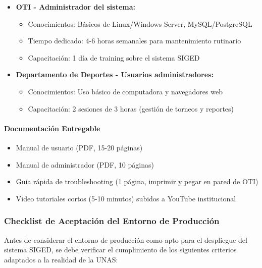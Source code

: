 \documentclass[12pt,a4paper]{article}
\begin{document}
\begin{itemize}[noitemsep]
    \item \textbf{OTI - Administrador del sistema:} 
    \begin{itemize}
        \item Conocimientos: Básicos de Linux/Windows Server, MySQL/PostgreSQL
        \item Tiempo dedicado: 4-6 horas semanales para mantenimiento rutinario
        \item Capacitación: 1 día de training sobre el sistema SIGED
    \end{itemize}
    \item \textbf{Departamento de Deportes - Usuarios administradores:}
    \begin{itemize}
        \item Conocimientos: Uso básico de computadora y navegadores web
        \item Capacitación: 2 sesiones de 3 horas (gestión de torneos y reportes)
    \end{itemize}
\end{itemize}

\paragraph{Documentación Entregable}

\begin{itemize}[noitemsep]
    \item Manual de usuario (PDF, 15-20 páginas)
    \item Manual de administrador (PDF, 10 páginas)
    \item Guía rápida de troubleshooting (1 página, imprimir y pegar en pared de OTI)
    \item Video tutoriales cortos (5-10 minutos) subidos a YouTube institucional
\end{itemize}

\subsubsection{Checklist de Aceptación del Entorno de Producción}

Antes de considerar el entorno de producción como apto para el despliegue del sistema SIGED, se debe verificar el cumplimiento de los siguientes criterios adaptados a la realidad de la UNAS:
\end{document}
